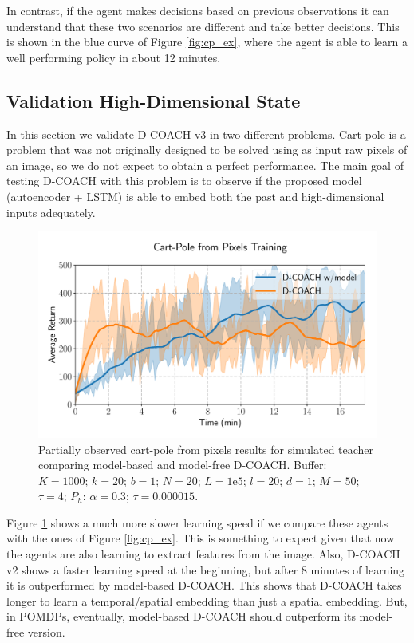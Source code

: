 In contrast, if the agent makes decisions based on previous observations it can understand that these two scenarios are different and take better decisions. This is shown in the blue curve of Figure \ref{fig:cp_ex}, where the agent is able to learn a well performing policy in about 12 minutes. 

\subsection{Validation High-Dimensional State}
In this section we validate D-COACH v3 in two different problems. Cart-pole is a problem that was not originally designed to be solved using as input raw pixels of an image, so we do not expect to obtain a perfect performance. The main goal of testing D-COACH with this problem is to observe if the proposed model (autoencoder + LSTM) is able to embed both the past and high-dimensional inputs adequately.

\begin{figure}[h]
    \centering
    \includegraphics[width=0.9\linewidth]{imagenes/cap3/cartpole_HD_model.pdf}
    \caption{Partially observed cart-pole from pixels results for simulated teacher comparing model-based and model-free D-COACH.  Buffer: $K = 1000$; $k=20$; $b = 1$; $N = 20$; $L=1\mathrm{e}5$; $l=20$; $d=1$; $M=50$; $\tau=4$; $P_{h}$: $\alpha = 0.3$; $\tau = 0.000015$.}
    \label{fig:cp_hd}
\end{figure}

Figure \ref{fig:cp_hd} shows a much more slower learning speed if we compare these agents with the ones of Figure \ref{fig:cp_ex}. This is something to expect given that now the agents are also learning to extract features from the image. Also, D-COACH v2 shows a faster learning speed at the beginning, but after 8 minutes of learning it is outperformed by model-based D-COACH. This shows that D-COACH takes longer to learn a temporal/spatial embedding than just a spatial embedding. But, in POMDPs, eventually, model-based D-COACH should outperform its model-free version.

